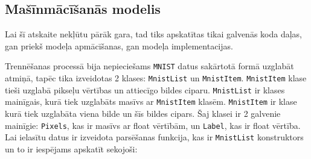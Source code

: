 \subsection{Mašīnmācīšanās modelis}

    Lai šī atskaite nekļūtu pārāk gara, tad tiks apskatītas tikai galvenās koda daļas, gan priekš
    modeļa apmācīšanas, gan modeļa implementacijas.

    Trennēšanas processā bija nepieciešams \texttt{MNIST} datus sakārtotā formā uzglabāt atmiņā, tapēc
    tika izveidotas 2 klases: \texttt{MnistList} un \texttt{MnistItem}. \texttt{MnistItem} klase tieši
    uzglabā pikseļu vērtības un attiecīgo bildes ciparu. \texttt{MnistList} ir klases mainīgais, kurā
    tiek uzglabāts masīvs ar \texttt{MnistItem} klasēm. \texttt{MnistItem} ir klase kurā tiek uzglabāta
    viena bilde un šīs bildes cipars. Šaj klasei ir 2 galvenie mainīgie: \texttt{Pixels}, kas ir masīvs
    ar float vērtībām, un \texttt{Label}, kas ir float vērtība. Lai ielasītu datus ir izveidota parsēšanas
    funkcija, kas ir \texttt{MnistList} konstruktors un to ir iespējams apskatīt sekojoši:

    
